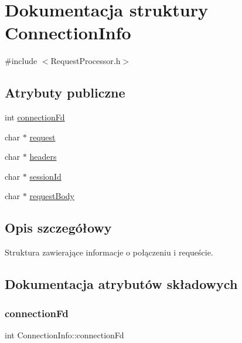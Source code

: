\hypertarget{structConnectionInfo}{}\section{Dokumentacja struktury Connection\+Info}
\label{structConnectionInfo}


{\ttfamily \#include $<$Request\+Processor.\+h$>$}

\subsection*{Atrybuty publiczne}
\begin{DoxyCompactItemize}
\item 
int \mbox{\hyperlink{structConnectionInfo_a6c8c552a26539066578b4ee4d8586df8}{connection\+Fd}}
\item 
char $\ast$ \mbox{\hyperlink{structConnectionInfo_abef1c49c25772ad45647263d15f7daf0}{request}}
\item 
char $\ast$ \mbox{\hyperlink{structConnectionInfo_ad89c0ba26977cecdb45ff8cac8090efe}{headers}}
\item 
char $\ast$ \mbox{\hyperlink{structConnectionInfo_ab53345d57548192751c2d5208c982b2f}{session\+Id}}
\item 
char $\ast$ \mbox{\hyperlink{structConnectionInfo_a9e85b690174699a9cde40f21131855b5}{request\+Body}}
\end{DoxyCompactItemize}


\subsection{Opis szczegółowy}
Struktura zawierające informacje o połączeniu i requeście. 

\subsection{Dokumentacja atrybutów składowych}
\mbox{\label{structConnectionInfo_a6c8c552a26539066578b4ee4d8586df8}} 
\subsubsection{\texorpdfstring{connectionFd}{connectionFd}}
{\footnotesize\ttfamily int Connection\+Info\+::connection\+Fd}

